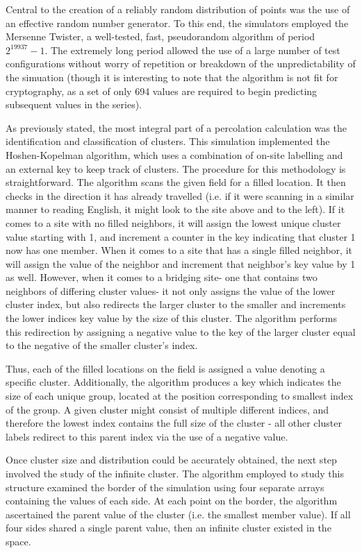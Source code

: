 \documentclass[twocolumn,prb,amsmath,amssymb,amsfonts]{revtex4}
\begin{document}
Central to the creation of a reliably random distribution of points was the use of an effective random number generator. To this end, the simulators employed the Mersenne Twister, a well-tested, fast, pseudorandom algorithm of period $2^{19937}-1$. The extremely long period allowed the use of a large number of test configurations without worry of repetition or breakdown of the unpredictability of the simuation (though it is interesting to note that the algorithm is not fit for cryptography, as a set of only 694 values are required to begin predicting subsequent values in the series).

As previously stated, the most integral part of a percolation calculation was the identification and classification of clusters. This simulation implemented the Hoshen-Kopelman algorithm, which uses a combination of on-site labelling and an external key to keep track of clusters. The procedure for this methodology is straightforward. The algorithm scans the given field for a filled location. It then checks in the direction it has already travelled (i.e. if it were scanning in a similar manner to reading English, it might look to the site above and to the left). If it comes to a site with no filled neighbors, it will assign the lowest unique cluster value starting with 1, and increment a counter in the key indicating that cluster 1 now has one member. When it comes to a site that has a single filled neighbor, it will assign the value of the neighbor and increment that neighbor's key value by 1 as well. However, when it comes to a bridging site- one that contains two neighbors of differing cluster values- it not only assigns the value of the lower cluster index, but also redirects the larger cluster to the smaller and increments the lower indices key value by the size of this cluster. The algorithm performs this redirection by assigning a negative value to the key of the larger cluster equal to the negative of the smaller cluster's index. 

Thus, each of the filled locations on the field is assigned a value denoting a specific cluster. Additionally, the algorithm produces a key which indicates the size of each unique group, located at the position corresponding to smallest index of the group. A given cluster might consist of multiple different indices, and therefore the lowest index contains the full size of the cluster - all other cluster labels redirect to this parent index via the use of a negative value.

Once cluster size and distribution could be accurately obtained, the next step involved the study of the infinite cluster. The algorithm employed to study this structure examined the border of the simulation using four separate arrays containing the values of each side. At each point on the border, the algorithm ascertained the parent value of the cluster (i.e. the smallest member value). If all four sides shared a single parent value, then an infinite cluster existed in the space.
\end{document}
